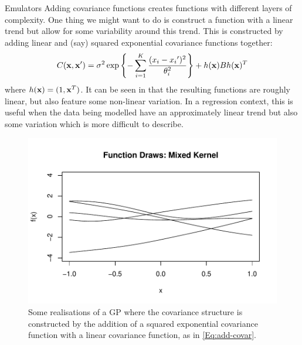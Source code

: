 \begin{chapter}{Emulators \label{Ch:Emulators}}
Adding covariance functions creates functions with different layers of complexity. One thing we might want to do is construct a function with a linear trend but allow for some variability around this trend. This is constructed by adding linear and (say) squared exponential covariance functions together:
\begin{equation}
C(\mathbf{x}, \mathbf{x}') = \sigma^2 \exp\left\{ - \sum_{i = 1}^K \frac{(x_i - {x_i}')^2}{\theta_i^2}\right\} +
h(\mathbf{x}) B  h(\mathbf{x})^T \label{Eq:add-covar}
\end{equation}
where $h(\mathbf{x}) = (1, \mathbf{x}^T)$. It can be seen in  that the resulting functions are roughly linear, but also feature some non-linear variation. In a regression context, this is useful when the data being modelled have an approximately linear trend but also some variation which is more difficult to describe.
\begin{figure}[h]
  \centering
  \includegraphics{fig-emulators/mixed-draws.pdf}
  \caption{Some realisations of a GP where the covariance structure is constructed by the addition of a squared exponential covariance function with a linear covariance function, as in \cref{Eq:add-covar}.}
  \label{Fig:mix-kern}
\end{figure}

\end{chapter}
